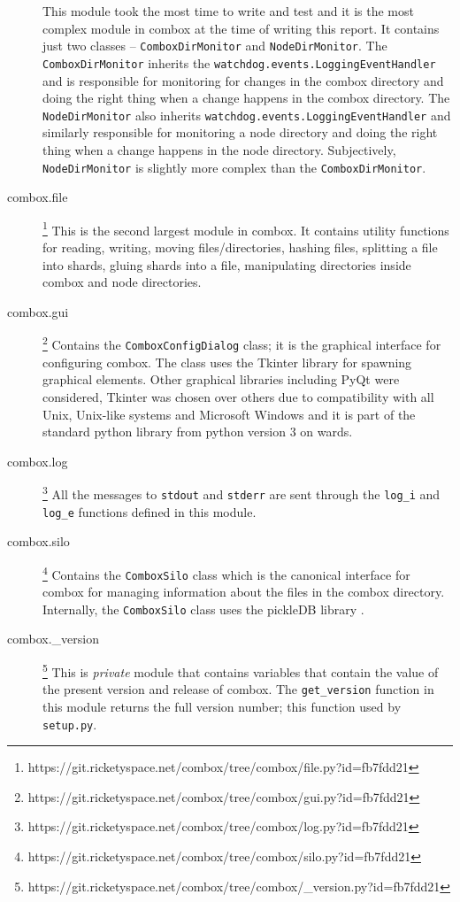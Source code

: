 \begin{description}
  This module took the most time to write and test and it is the most
  complex module in combox at the time of writing this report. It
  contains just two classes -- \verb+ComboxDirMonitor+ and
  \verb+NodeDirMonitor+. The \verb+ComboxDirMonitor+ inherits the
  \verb+watchdog.events.LoggingEventHandler+ and is responsible for
  monitoring for changes in the combox directory and doing the right
  thing when a change happens in the combox directory. The
  \verb+NodeDirMonitor+ also inherits
  \verb+watchdog.events.LoggingEventHandler+ and similarly responsible
  for monitoring a node directory and doing the right thing when a
  change happens in the node directory. Subjectively,
  \verb+NodeDirMonitor+ is slightly more complex than the
  \verb+ComboxDirMonitor+.
\item[combox.file]
  \footnote{https://git.ricketyspace.net/combox/tree/combox/file.py?id=fb7fdd21}
  This is the second largest module in combox. It contains utility
  functions for reading, writing, moving files/directories, hashing
  files, splitting a file into shards, gluing shards into a file,
  manipulating directories inside combox and node directories.
\item[combox.gui]
  \footnote{https://git.ricketyspace.net/combox/tree/combox/gui.py?id=fb7fdd21}
  Contains the \verb+ComboxConfigDialog+ class; it is the graphical
  interface for configuring combox. The class uses the Tkinter library
  \cite{pylib:tkinter} for spawning graphical elements. Other
  graphical libraries including PyQt \cite{pylib:qt} were considered,
  Tkinter was chosen over others due to compatibility with all Unix,
  Unix-like systems and Microsoft Windows and it is part of the
  standard python library from python version 3 on wards.
\item[combox.log]
  \footnote{https://git.ricketyspace.net/combox/tree/combox/log.py?id=fb7fdd21}
  All the messages to \verb+stdout+ and \verb+stderr+ are sent through
  the \verb+log_i+ and \verb+log_e+ functions defined in this module.
\item[combox.silo]
  \footnote{https://git.ricketyspace.net/combox/tree/combox/silo.py?id=fb7fdd21}
  Contains the \verb+ComboxSilo+ class which is the canonical
  interface for combox for managing information about the files in the
  combox directory. Internally, the \verb+ComboxSilo+ class uses the
  pickleDB library \cite{pylib:pickledb}.
\item[combox.\_version]
  \footnote{https://git.ricketyspace.net/combox/tree/combox/\_version.py?id=fb7fdd21}
  This is \emph{private} module that contains variables that contain
  the value of the present version and release of combox. The
  \verb+get_version+ function in this module returns the full version
  number; this function used by \verb+setup.py+.
\end{description}

